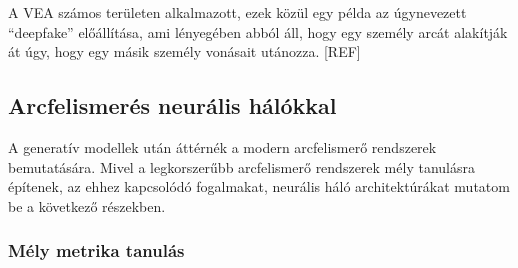 A VEA számos területen alkalmazott, ezek közül egy példa az úgynevezett ``deepfake'' előállítása, ami lényegében abból áll, hogy egy személy arcát alakítják át úgy, hogy egy másik személy vonásait utánozza. [REF]





\subsection{Arcfelismerés neurális hálókkal}

A generatív modellek után áttérnék a modern arcfelismerő rendszerek bemutatására. Mivel a legkorszerűbb arcfelismerő rendszerek mély tanulásra építenek, az ehhez kapcsolódó fogalmakat, neurális háló architektúrákat mutatom be a következő részekben.

\subsubsection{Mély metrika tanulás}

